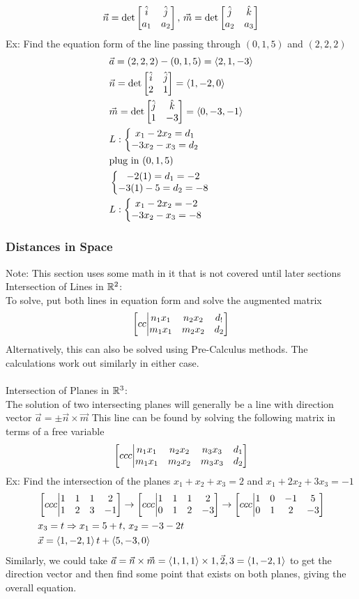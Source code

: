 \documentclass[11pt, fleqn]{article}
\begin{document}
$$\vec{n}=\det\matrixx{\hat{i}&\hat{j}\\a_1&a_2},\,\vec{m}=\det\matrixx{\hat{j}&\hat{k}\\a_2&a_3}$$
Ex: Find the equation form of the line passing through $(0,1,5)$ and $(2,2,2)$
\begin{align*}
    &\vec{a}=(2,2,2)-(0,1,5)=\brangle{2,1,-3}\\
    &\vec{n}=\det\matrixx{\hat{i}&\hat{j}\\2&1}=\brangle{1,-2,0}\\
    &\vec{m}=\det\matrixx{\hat{j}&\hat{k}\\1&-3}=\brangle{0,-3,-1}\\
    &L:\eqnsystem{x_1-2x_2=d_1\\-3x_2-x_3=d_2}\\
    &\text{plug in }(0,1,5)\\
    &\eqnsystem{-2(1)=d_1=-2\\-3(1)-5=d_2=-8}\\
    &L:\eqnsystem{x_1-2x_2=-2\\-3x_2-x_3=-8}
\end{align*}
\subsubsection{Distances in Space}
Note: This section uses some math in it that is not covered until later sections\\
Intersection of Lines in $\mathbb{R}^2$:\\
To solve, put both lines in equation form and solve the augmented matrix
$$\augmatrix{cc}{n_1x_1&n_2x_2&d_!\\m_1x_1&m_2x_2&d_2}$$
Alternatively, this can also be solved using Pre-Calculus methods. The calculations work out similarly in either case.\\
\\
Intersection of Planes in $\mathbb{R}^3$:\\
The solution of two intersecting planes will generally be a line with direction vector $\vec{a}=\pm\vec{n}\times\vec{m}$
This line can be found by solving the following matrix in terms of a free variable
$$\augmatrix{ccc}{n_1x_1&n_2x_2&n_3x_3&d_1\\m_1x_1&m_2x_2&m_3x_3&d_2}$$
Ex: Find the intersection of the planes $x_1+x_2+x_3=2$ and $x_1+2x_2+3x_3=-1$
\begin{align*}
    &\augmatrix{ccc}{1&1&1&2\\1&2&3&-1}\to\augmatrix{ccc}{1&1&1&2\\0&1&2&-3}\to\augmatrix{ccc}{1&0&-1&5\\0&1&2&-3}\\
    &x_3=t\Ra x_1=5+t,\,x_2=-3-2t\\
    &\vec{x}=\brangle{1,-2,1}t+\brangle{5,-3,0}
\end{align*}
Similarly, we could take $\vec{a}=\vec{n}\times\vec{m}=\left\langle 1,1,1 \right\rangle\times\vec{1,2,3}=\left\langle 1,-2,1 \right\rangle$ to get the direction vector and then find some point that exists on both planes, giving the overall equation.\\
\end{document}
